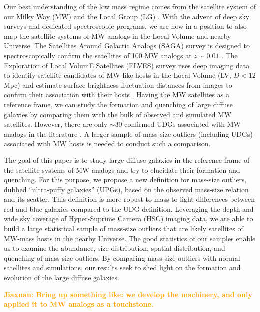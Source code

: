 \documentclass[twocolumn,astrosymb,twocolappendix]{aastex631}
\newcommand{\jiaxuan}[1]{\textcolor{orange}{\textbf{Jiaxuan: #1}}}
\begin{document}
\begin{CJK*}{UTF8}{gbsn}
Our best understanding of the low mass regime comes from the satellite system of our Milky Way (MW) and the Local Group (LG) \citep[e.g.,][]{McConnachie2012,Simon2019}. With the advent of deep sky surveys and dedicated spectroscopic programs, we are now in a position to also map the satellite systems of MW analogs in the Local Volume and nearby Universe. The Satellites Around Galactic Analogs (SAGA) survey is designed to spectroscopically confirm the satellites of 100 MW analogs at $z\sim0.01$ \citep{SAGA-I,SAGA-II}. The Exploration of Local VolumE Satellites (ELVES) survey uses deep imaging data to identify satellite candidates of MW-like hosts in the Local Volume (LV, $D<12$ Mpc) and estimate surface brightness fluctuation distances from images to confirm their association with their hosts \citep{ELVES-I,ELVES-II,CarlstenELVES2022}. Having the MW satellites as a reference frame, we can study the formation and quenching of large diffuse galaxies by comparing them with the bulk of observed and simulated MW satellites. However, there are only $\sim 30$ confirmed UDGs associated with MW analogs in the literature \citep{Roman2017b,Cohen2018,SAGA-II,CarlstenELVES2022}. A larger sample of mass-size outliers (including UDGs) associated with MW hosts is needed to conduct such a comparison.

The goal of this paper is to study large diffuse galaxies in the reference frame of the satellite systems of MW analogs and try to elucidate their formation and quenching. For this purpose, we propose a new definition for mass-size outliers, dubbed ``ultra-puffy galaxies'' (UPGs), based on the observed mass-size relation and its scatter. This definition is more robust to mass-to-light differences between red and blue galaxies compared to the UDG definition. Leveraging the depth and wide sky coverage of Hyper-Suprime Camera (HSC) imaging data, we are able to build a large statistical sample of mass-size outliers that are likely satellites of MW-mass hosts in the nearby Universe. The good statistics of our samples enable us to examine the abundance, size distribution, spatial distribution, and quenching of mass-size outliers. By comparing mass-size outliers with normal satellites and simulations, our results seek to shed light on the formation and evolution of the large diffuse galaxies. 

\jiaxuan{Bring up something like: we develop the machinery, and only applied it to MW analogs as a touchstone.}



\end{CJK*}
\end{document}
